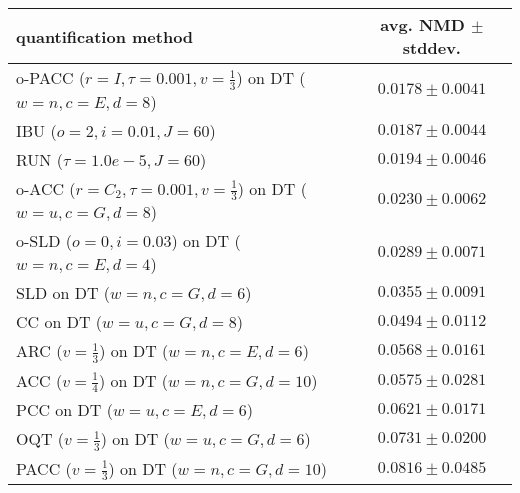 \begin{tabular}{lc}
  \toprule
  quantification method & avg. NMD $\pm$ stddev. \\
  \midrule
  o-PACC ($r=I, \tau=0.001, v=\frac{1}{3}$) on DT ($w=n, c=E, d=8$) & $\mathbf{0.0178 \pm 0.0041}$ \\
  IBU ($o=2, i=0.01, J=60$) & $0.0187 \pm 0.0044$ \\
  RUN ($\tau=1.0e-5, J=60$) & $0.0194 \pm 0.0046$ \\
  o-ACC ($r=C_2, \tau=0.001, v=\frac{1}{3}$) on DT ($w=u, c=G, d=8$) & $0.0230 \pm 0.0062$ \\
  o-SLD ($o=0, i=0.03$) on DT ($w=n, c=E, d=4$) & $0.0289 \pm 0.0071$ \\
  SLD on DT ($w=n, c=G, d=6$) & $0.0355 \pm 0.0091$ \\
  CC on DT ($w=u, c=G, d=8$) & $0.0494 \pm 0.0112$ \\
  ARC ($v=\frac{1}{3}$) on DT ($w=n, c=E, d=6$) & $0.0568 \pm 0.0161$ \\
  ACC ($v=\frac{1}{4}$) on DT ($w=n, c=G, d=10$) & $0.0575 \pm 0.0281$ \\
  PCC on DT ($w=u, c=E, d=6$) & $0.0621 \pm 0.0171$ \\
  OQT ($v=\frac{1}{3}$) on DT ($w=u, c=G, d=6$) & $0.0731 \pm 0.0200$ \\
  PACC ($v=\frac{1}{3}$) on DT ($w=n, c=G, d=10$) & $0.0816 \pm 0.0485$ \\
  \bottomrule
\end{tabular}

